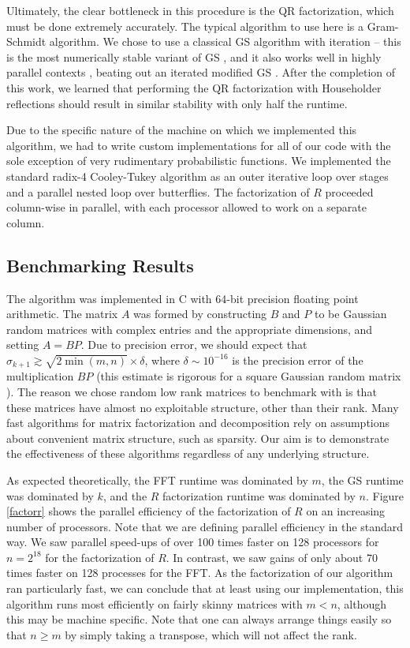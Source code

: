 \documentclass[11pt]{article}
\begin{document}
Ultimately, the clear bottleneck in this procedure is the QR factorization, which must be done extremely accurately.   The typical algorithm to use here is a Gram-Schmidt algorithm.   We chose to use a classical GS algorithm with iteration -- this is the most numerically stable variant of GS \cite{bjorck}, and it also works well in highly parallel contexts \cite{lingen}, beating out an iterated modified GS \cite{hoffman}.    After the completion of this work, we learned that performing the QR factorization with Householder reflections should result in similar stability with only half the runtime.

Due to the specific nature of the machine on which we implemented this algorithm, we had to write custom implementations for all of our code with the sole exception of very rudimentary probabilistic functions.   We implemented the standard radix-4 Cooley-Tukey algorithm as an outer iterative loop over stages and a parallel nested loop over butterflies.     The factorization of $R$ proceeded column-wise in parallel, with each processor allowed to work on a separate column.    
\subsection{Benchmarking Results}
The algorithm was implemented in C with 64-bit precision floating point arithmetic.  The matrix $A$ was formed by constructing $B$ and $P$ to be Gaussian random matrices with complex entries and the appropriate dimensions, and setting $A=BP$.   Due to precision error, we should expect that $\sigma_{k+1} \gtrsim \sqrt{2\min(m,n)}\times \delta$, where $\delta\sim 10^{-16}$ is the precision error of the multiplication $BP$ (this estimate is rigorous for a square Gaussian random matrix \cite{rokyale1}).   The reason we chose random low rank matrices to benchmark with is that these matrices have almost no exploitable structure, other than their rank.  Many fast algorithms for matrix factorization and decomposition rely on assumptions about convenient matrix structure, such as sparsity.   Our aim is to demonstrate the effectiveness of these algorithms regardless of any underlying structure.

As expected theoretically, the FFT runtime was dominated by $m$, the GS runtime was dominated by $k$, and the $R$ factorization runtime was dominated by $n$.  Figure \ref{factorr} shows the parallel efficiency of the factorization of $R$ on an increasing number of processors.  Note that we are defining parallel efficiency in the standard way.
We saw parallel speed-ups of over 100 times faster on 128 processors for $n=2^{18}$ for the factorization of $R$.  In contrast, we saw gains of only about 70 times faster on 128 processes for the FFT.  As the factorization of our algorithm ran particularly fast, we can conclude that at least using our implementation, this algorithm runs most efficiently on fairly skinny matrices with $m<n$, although this may be machine specific.  Note that one can always arrange things easily so that $n\ge m$ by simply taking a transpose, which will not affect the rank.
\end{document}
